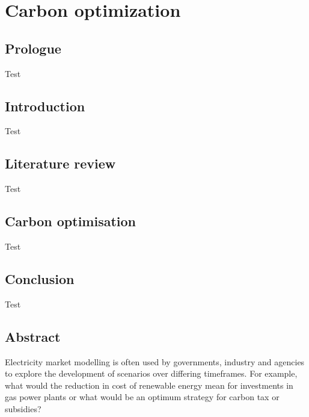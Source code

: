 \chapter{Carbon optimization}

\ifpdf
    \graphicspath{{Chapter3/Figs/Raster/}{Chapter3/Figs/PDF/}{Chapter3/Figs/}}
\else
    \graphicspath{{Chapter3/Figs/Vector/}{Chapter3/Figs/}}
\fi



\section{Prologue}

Test

\section{Introduction}

Test

\section{Literature review}

Test

\section{Carbon optimisation}

Test

\section{Conclusion}


Test









\section{Abstract}

Electricity market modelling is often used by governments, industry and agencies to explore the development of scenarios over differing timeframes. For example, what would the reduction in cost of renewable energy mean for investments in gas power plants or what would be an optimum strategy for carbon tax or subsidies? %

